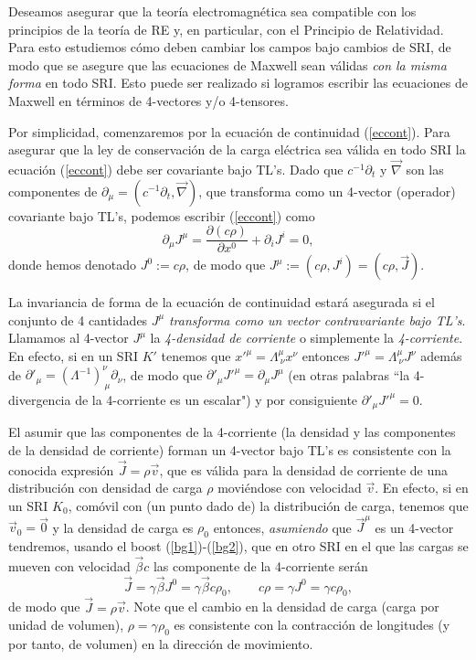 Deseamos asegurar que la teoría electromagnética sea compatible con los
principios de la teoría de RE y, en particular, con el Principio de Relatividad. Para esto estudiemos cómo deben cambiar los campos bajo cambios de SRI, de modo que se asegure que las ecuaciones de Maxwell sean válidas \textit{con la misma forma} en todo SRI. Esto puede ser realizado si logramos escribir las ecuaciones de Maxwell en términos de 4-vectores y/o 4-tensores.

Por simplicidad, comenzaremos por la ecuación de continuidad (\ref{eccont}). Para asegurar que la ley de conservación de la carga eléctrica sea válida en todo SRI la
ecuación (\ref{eccont}) debe ser covariante bajo TL's.  Dado que
$c^{-1}\partial_t$ y $\vec{\nabla}$ son las componentes de
$\partial_\mu=(c^{-1}\partial_t, \vec\nabla)$, que transforma
como un 4-vector (operador) covariante bajo TL's, podemos escribir
(\ref{eccont}) como
\begin{equation}
\partial_\mu J^\mu=\frac{\partial(c \rho)}{\partial x^0} + \partial_i J^i =0
,\label{dj0}
\end{equation}
donde hemos denotado $J^0:=c \rho $, 
de modo que $J^\mu :=(c \rho,J^i)=(c \rho,\vec{J})$.

La invariancia de forma de la ecuación de continuidad estará asegurada si el conjunto de 4 cantidades $J^\mu$ \textit{transforma como un vector contravariante bajo TL's}. Llamamos al 4-vector $J^\mu$ la \textit{4-densidad de corriente} o simplemente la \textit{4-corriente}. En efecto, si en un SRI $K'$ tenemos que $x'^\mu=\Lambda^\mu_{\ \nu}x^\nu$ entonces $J'^\mu=\Lambda^\mu_{\ \nu}J^\nu$ además de $\partial'_\mu=(\Lambda^{-1})^\nu_{\  \mu}\partial_\nu$, de modo que $\partial'_\mu J'^\mu=\partial_\mu J^\mu$ (en otras palabras ``la 4-divergencia de la 4-corriente es un escalar") y por consiguiente $\partial'_\mu J'^\mu=0$.

El asumir que las componentes de la 4-corriente (la densidad y las componentes de la densidad de corriente) forman un 4-vector bajo TL's es consistente con la conocida expresión $\vec{J}=\rho\vec{v}$, que es válida para la densidad de corriente de una
distribución con densidad de carga $\rho$ moviéndose con velocidad $\vec{v}$.
En efecto, si en un SRI $K_0$, comóvil con (un punto dado de) la distribución de carga, tenemos que $\vec{v}_0=\vec{0}$ y la densidad de carga es $\rho_0$ entonces, \textit{asumiendo} que $\vec{J}^\mu$ es un 4-vector tendremos, usando el boost (\ref{bg1})-(\ref{bg2}), que en otro SRI en el que las cargas se mueven con velocidad $\vec\beta c$ las componente de la 4-corriente serán
\begin{equation}
\vec{J}=\gamma\vec\beta J^0=\gamma\vec\beta c \rho_0, \qquad  c\rho=\gamma J^0=\gamma c
\rho_0,
\end{equation}
de modo que $\vec{J}=\rho\vec{v}$. Note que el cambio en la densidad de
carga (carga por unidad de volumen), $\rho=\gamma\rho_0$ es consistente con la contracción de longitudes (y por tanto, de volumen) en la dirección de movimiento.

